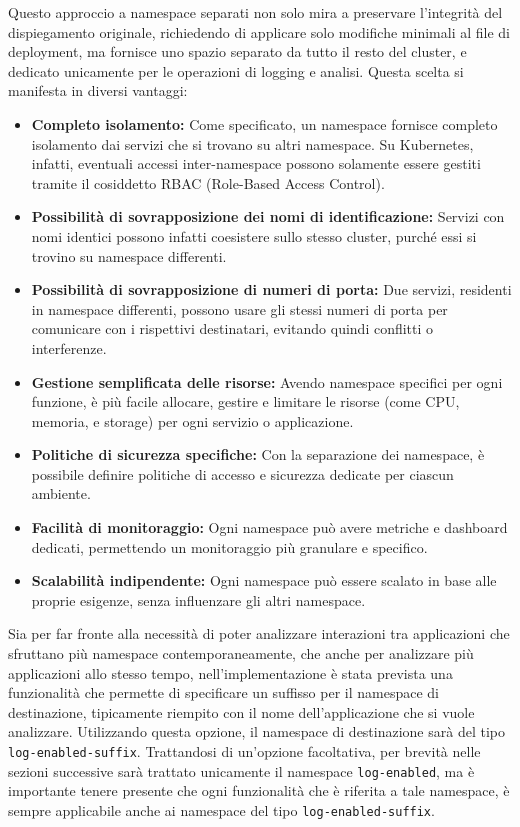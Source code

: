 Questo approccio a namespace separati non solo mira a preservare l'integrità del dispiegamento originale, richiedendo di applicare solo modifiche minimali al file di deployment, ma fornisce uno spazio separato da tutto il resto del cluster, e dedicato unicamente per le operazioni di logging e analisi. Questa scelta si manifesta in diversi vantaggi:
\begin{itemize}
\item \textbf{Completo isolamento:} Come specificato, un namespace fornisce completo isolamento dai servizi che si trovano su altri namespace. Su Kubernetes, infatti, eventuali accessi inter-namespace possono solamente essere gestiti tramite il cosiddetto RBAC (Role-Based Access Control).
\item \textbf{Possibilità di sovrapposizione dei nomi di identificazione:} Servizi con nomi identici possono infatti coesistere sullo stesso cluster, purché essi si trovino su namespace differenti.
\item \textbf{Possibilità di sovrapposizione di numeri di porta:} Due servizi, residenti in namespace differenti, possono usare gli stessi numeri di porta per comunicare con i rispettivi destinatari, evitando quindi conflitti o interferenze.
\item \textbf{Gestione semplificata delle risorse:} Avendo namespace specifici per ogni funzione, è più facile allocare, gestire e limitare le risorse (come CPU, memoria, e storage) per ogni servizio o applicazione.
\item \textbf{Politiche di sicurezza specifiche:} Con la separazione dei namespace, è possibile definire politiche di accesso e sicurezza dedicate per ciascun ambiente.
\item \textbf{Facilità di monitoraggio:} Ogni namespace può avere metriche e dashboard dedicati, permettendo un monitoraggio più granulare e specifico.
\item \textbf{Scalabilità indipendente:} Ogni namespace può essere scalato in base alle proprie esigenze, senza influenzare gli altri namespace.
\end{itemize}

Sia per far fronte alla necessità di poter analizzare interazioni tra applicazioni che sfruttano più namespace contemporaneamente, che anche per analizzare più applicazioni allo stesso tempo, nell'implementazione è stata prevista una funzionalità che permette di specificare un suffisso per il namespace di destinazione, tipicamente riempito con il nome dell'applicazione che si vuole analizzare. Utilizzando questa opzione, il namespace di destinazione sarà del tipo \texttt{log-enabled-suffix}. Trattandosi di un'opzione facoltativa, per brevità nelle sezioni successive sarà trattato unicamente il namespace \texttt{log-enabled}, ma è importante tenere presente che ogni funzionalità che è riferita a tale namespace, è sempre applicabile anche ai namespace del tipo \texttt{log-enabled-suffix}.



